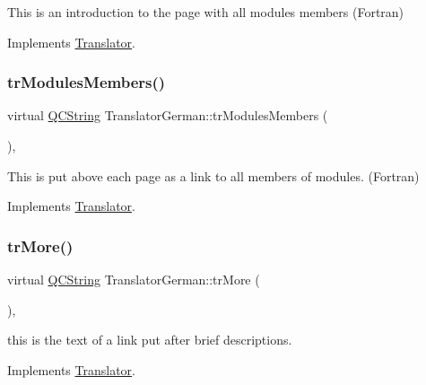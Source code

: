 This is an introduction to the page with all modules members (Fortran) 

Implements \mbox{\hyperlink{class_translator}{Translator}}.

\mbox{\label{class_translator_german_a4716a53205f0475f3269ba55df18c8cc}} 
\subsubsection{\texorpdfstring{trModulesMembers()}{trModulesMembers()}}
{\footnotesize\ttfamily virtual \mbox{\hyperlink{class_q_c_string}{Q\+C\+String}} Translator\+German\+::tr\+Modules\+Members (\begin{DoxyParamCaption}{ }\end{DoxyParamCaption})\hspace{0.3cm}{\ttfamily [inline]}, {\ttfamily [virtual]}}

This is put above each page as a link to all members of modules. (Fortran) 

Implements \mbox{\hyperlink{class_translator}{Translator}}.

\mbox{\label{class_translator_german_a9a9c1e2968e0342a9cbe60831c41394b}} 
\subsubsection{\texorpdfstring{trMore()}{trMore()}}
{\footnotesize\ttfamily virtual \mbox{\hyperlink{class_q_c_string}{Q\+C\+String}} Translator\+German\+::tr\+More (\begin{DoxyParamCaption}{ }\end{DoxyParamCaption})\hspace{0.3cm}{\ttfamily [inline]}, {\ttfamily [virtual]}}

this is the text of a link put after brief descriptions. 

Implements \mbox{\hyperlink{class_translator}{Translator}}.

\mbox{\label{class_translator_german_acdc1e5e621a20175271eb4854c66ab33}} 
